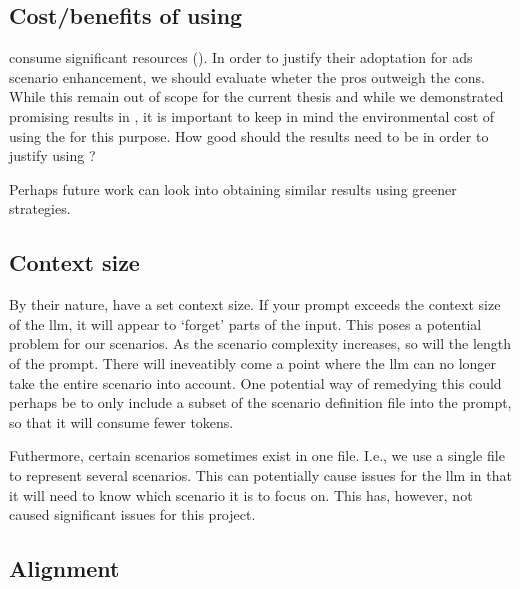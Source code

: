 \subsection{Cost/benefits of using }

 consume significant resources (). In order to justify their
adoptation for \acrshort{ads} scenario enhancement, we should evaluate wheter the pros outweigh the
cons. While this remain out of scope for the current thesis and while we demonstrated promising
results in , it is important to keep in mind the environmental cost of using the
 for this purpose. How good should the results need to be in order to justify using
?

Perhaps future work can look into obtaining similar results using greener strategies.


\subsection{Context size}

By their nature,  have a set context size. If your prompt exceeds the context size
of the \acrshort{llm}, it will appear to `forget' parts of the input. This poses a potential problem
for our scenarios. As the scenario complexity increases, so will the length of the prompt. There
will ineveatibly come a point where the \acrshort{llm} can no longer take the entire scenario into
account. One potential way of remedying this could perhaps be to only include a subset of the
scenario definition file into the prompt, so that it will consume fewer tokens.

Futhermore, certain scenarios sometimes exist in one file. I.e., we use a single file to represent
several scenarios. This can potentially cause issues for the \acrshort{llm} in that it will need to
know which scenario it is to focus on. This has, however, not caused significant issues for this project.

\subsection{Alignment}

